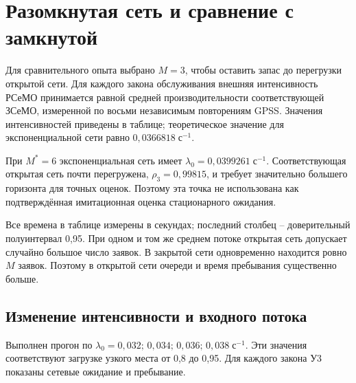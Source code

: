 \documentclass[12pt,a4paper]{article}
\begin{document}
\section{Разомкнутая сеть и сравнение с замкнутой}
Для сравнительного опыта выбрано \(M=3\), чтобы оставить запас до перегрузки открытой сети. Для каждого закона обслуживания внешняя интенсивность РСеМО принимается равной средней производительности соответствующей ЗСеМО, измеренной по восьми независимым повторениям GPSS. Значения интенсивностей приведены в таблице; теоретическое значение для экспоненциальной сети равно \(0{,}0366818\;\text{с}^{-1}\).

При \(M^*=6\) экспоненциальная сеть имеет \(\lambda_0=0{,}0399261\;\text{с}^{-1}\). Соответствующая открытая сеть почти перегружена, \(\rho_3=0{,}99815\), и требует значительно большего горизонта для точных оценок. Поэтому эта точка не использована как подтверждённая имитационная оценка стационарного ожидания.

\begin{center}\small\renewcommand{\arraystretch}{1.3}
\end{center}


Все времена в таблице измерены в секундах; последний столбец -- доверительный полуинтервал 0,95. При одном и том же среднем потоке открытая сеть допускает случайно большое число заявок. В закрытой сети одновременно находится ровно \(M\) заявок. Поэтому в открытой сети очереди и время пребывания существенно больше.
\subsection{Изменение интенсивности и входного потока}
Выполнен прогон по \(\lambda_0=0{,}032;\,0{,}034;\,0{,}036;\,0{,}038\;\text{с}^{-1}\). Эти значения соответствуют загрузке узкого места от 0,8 до 0,95. Для каждого закона У3 показаны сетевые ожидание и пребывание.
\end{document}
